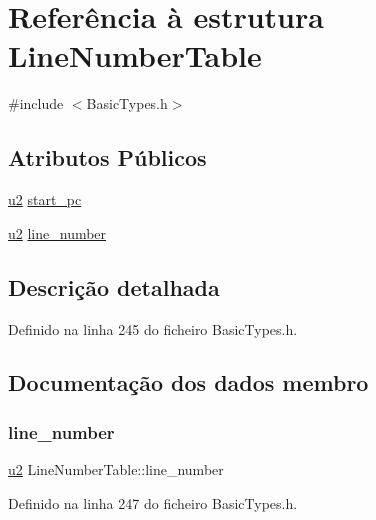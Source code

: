 \hypertarget{structLineNumberTable}{}\section{Referência à estrutura Line\+Number\+Table}
\label{structLineNumberTable}


{\ttfamily \#include $<$Basic\+Types.\+h$>$}

\subsection*{Atributos Públicos}
\begin{DoxyCompactItemize}
\item 
\hyperlink{BasicTypes_8h_a732cde1300aafb73b0ea6c2558a7a54f}{u2} \hyperlink{structLineNumberTable_a16496fea3c8c74d3a54f0104061f0df9}{start\+\_\+pc}
\item 
\hyperlink{BasicTypes_8h_a732cde1300aafb73b0ea6c2558a7a54f}{u2} \hyperlink{structLineNumberTable_a725cc8fff7109848d0a570930b381037}{line\+\_\+number}
\end{DoxyCompactItemize}


\subsection{Descrição detalhada}


Definido na linha 245 do ficheiro Basic\+Types.\+h.



\subsection{Documentação dos dados membro}
\mbox{\label{structLineNumberTable_a725cc8fff7109848d0a570930b381037}} 
\subsubsection{\texorpdfstring{line\+\_\+number}{line\_number}}
{\footnotesize\ttfamily \hyperlink{BasicTypes_8h_a732cde1300aafb73b0ea6c2558a7a54f}{u2} Line\+Number\+Table\+::line\+\_\+number}



Definido na linha 247 do ficheiro Basic\+Types.\+h.



